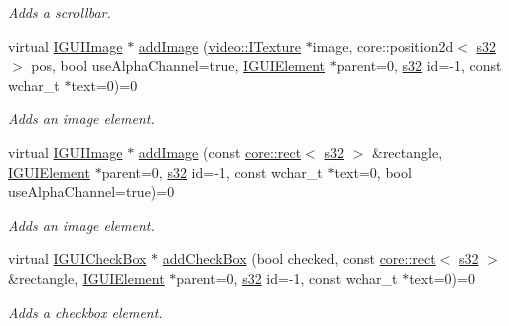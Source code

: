 \begin{DoxyCompactItemize}
\begin{DoxyCompactList}\small\item\em Adds a scrollbar. \end{DoxyCompactList}\item 
virtual \hyperlink{classirr_1_1gui_1_1IGUIImage}{I\+G\+U\+I\+Image} $\ast$ \hyperlink{classirr_1_1gui_1_1IGUIEnvironment_a35cc257b3a183551a2ed0376dcec9fe4}{add\+Image} (\hyperlink{classirr_1_1video_1_1ITexture}{video\+::\+I\+Texture} $\ast$image, core\+::position2d$<$ \hyperlink{namespaceirr_ac66849b7a6ed16e30ebede579f9b47c6}{s32} $>$ pos, bool use\+Alpha\+Channel=true, \hyperlink{classirr_1_1gui_1_1IGUIElement}{I\+G\+U\+I\+Element} $\ast$parent=0, \hyperlink{namespaceirr_ac66849b7a6ed16e30ebede579f9b47c6}{s32} id=-\/1, const wchar\+\_\+t $\ast$text=0)=0
\begin{DoxyCompactList}\small\item\em Adds an image element. \end{DoxyCompactList}\item 
virtual \hyperlink{classirr_1_1gui_1_1IGUIImage}{I\+G\+U\+I\+Image} $\ast$ \hyperlink{classirr_1_1gui_1_1IGUIEnvironment_a0f84bdf59447419bb0555f001f68d889}{add\+Image} (const \hyperlink{classirr_1_1core_1_1rect}{core\+::rect}$<$ \hyperlink{namespaceirr_ac66849b7a6ed16e30ebede579f9b47c6}{s32} $>$ \&rectangle, \hyperlink{classirr_1_1gui_1_1IGUIElement}{I\+G\+U\+I\+Element} $\ast$parent=0, \hyperlink{namespaceirr_ac66849b7a6ed16e30ebede579f9b47c6}{s32} id=-\/1, const wchar\+\_\+t $\ast$text=0, bool use\+Alpha\+Channel=true)=0
\begin{DoxyCompactList}\small\item\em Adds an image element. \end{DoxyCompactList}\item 
virtual \hyperlink{classirr_1_1gui_1_1IGUICheckBox}{I\+G\+U\+I\+Check\+Box} $\ast$ \hyperlink{classirr_1_1gui_1_1IGUIEnvironment_a849a6970cda901fbcf745c757b46212e}{add\+Check\+Box} (bool checked, const \hyperlink{classirr_1_1core_1_1rect}{core\+::rect}$<$ \hyperlink{namespaceirr_ac66849b7a6ed16e30ebede579f9b47c6}{s32} $>$ \&rectangle, \hyperlink{classirr_1_1gui_1_1IGUIElement}{I\+G\+U\+I\+Element} $\ast$parent=0, \hyperlink{namespaceirr_ac66849b7a6ed16e30ebede579f9b47c6}{s32} id=-\/1, const wchar\+\_\+t $\ast$text=0)=0
\begin{DoxyCompactList}\small\item\em Adds a checkbox element. \end{DoxyCompactList}\item 

\end{DoxyCompactItemize}
